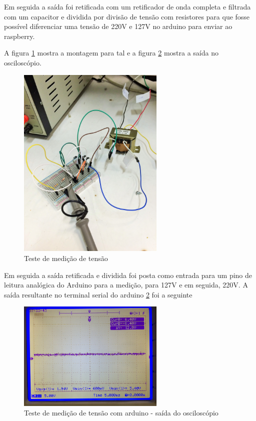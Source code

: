 Em seguida a saída foi retificada com um retificador de onda completa e filtrada com um capacitor e dividida por divisão de tensão com resistores para que fosse possível diferenciar uma tensão de 220V e 127V no arduino para enviar ao raspberry.

A figura \ref{fig:teste-medicao-tensao} mostra a montagem para tal e a figura \ref{fig:teste-medicao-tensao-osc} mostra a saída no osciloscópio.

\begin{figure}[H]
\centering
\includegraphics[width=7cm,keepaspectratio]{figuras/teste-medicao-tensao.jpg} 
\caption{\label{fig:teste-medicao-tensao} Teste de medição de tensão} 
\end{figure}

Em seguida a saída retificada e dividida foi posta como entrada para um pino de leitura analógica do Arduino para a medição, para 127V e em seguida, 220V. A saída resultante no terminal serial do arduino \ref{fig:teste-medicao-tensao-osc} foi a seguinte

\begin{figure}[H]
\centering
\includegraphics[width=7cm,keepaspectratio]{figuras/teste-medicao-tensao-osc.jpg} 
\caption{\label{fig:teste-medicao-tensao-osc} Teste de medição de tensão com arduino - saída do osciloscópio}
\end{figure}

